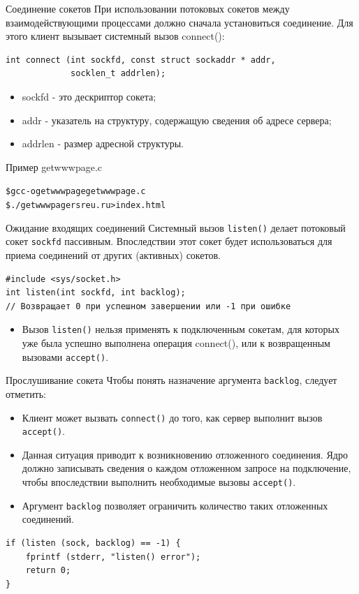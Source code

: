 \documentclass{beamer}
\begin{document}
\begin{frame}[fragile]{Соединение сокетов}
	При использовании потоковых сокетов между взаимодействующими процессами должно сначала установиться соединение.
	Для этого клиент вызывает системный вызов connect():
	\begin{verbatim}
int connect (int sockfd, const struct sockaddr * addr,
             socklen_t addrlen);
	\end{verbatim}
	\begin{itemize}
		\item sockfd - это дескриптор сокета;
		\item addr - указатель на структуру, содержащую сведения об адресе сервера;
		\item addrlen - размер адресной структуры.		
	\end{itemize}
	Пример getwwwpage.c
	\begin{alltt}
		\$ gcc -o getwwwpage getwwwpage.c
		\$ ./getwwwpage rsreu.ru > index.html
	\end{alltt}	
\end{frame}

\begin{frame}[fragile]{Ожидание входящих соединений}
    Системный вызов \texttt{listen()} делает потоковый сокет \texttt{sockfd} пассивным. Впоследствии этот сокет будет использоваться для приема соединений от других (активных) сокетов.

\begin{verbatim}
#include <sys/socket.h>
int listen(int sockfd, int backlog);
// Возвращает 0 при успешном завершении или -1 при ошибке
\end{verbatim}

	\begin{itemize}
		\item Вызов \texttt{listen()} нельзя применять к подключенным сокетам, для которых уже была успешно выполнена операция connect(), или к возвращенным вызовами \texttt{accept()}.
	\end{itemize}    			
\end{frame}

\begin{frame}[fragile]{Прослушивание сокета}
	Чтобы понять назначение аргумента \texttt{backlog}, следует отметить: 		
	\begin{itemize}
		\item Клиент может вызвать \texttt{connect()} до того, как сервер выполнит вызов \texttt{accept()}. 
		\item Данная ситуация приводит к возникновению отложенного соединения. Ядро должно записывать сведения о каждом отложенном запросе на подключение, чтобы впоследствии выполнить необходимые вызовы \texttt{accept()}. 
		\item Аргумент \texttt{backlog} позволяет ограничить количество таких отложенных соединений. 
	\end{itemize}    
	
	\begin{verbatim}
if (listen (sock, backlog) == -1) {
    fprintf (stderr, "listen() error");
    return 0;
}
	\end{verbatim}
\end{frame}
\end{document}
